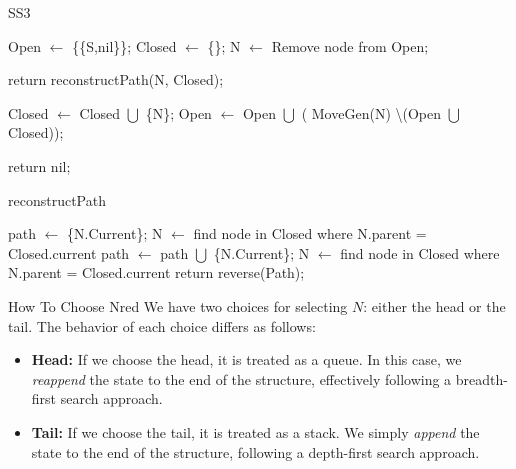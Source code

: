 \begin{algorithm}[ht]
\caption{SS3}
\begin{algorithmic}
\State Open \(\gets\) \{\{S,nil\}\};
\State Closed \(\gets\) \{\};
\vspace{0.1cm}
\State N \(\gets\) Remove node from Open;

\vspace{0.07cm}
\State return reconstructPath(N, Closed);
\Else

\State Closed \(\gets\) Closed \(\bigcup\) \{N\};
\State Open \(\gets\) Open \(\bigcup\) ( MoveGen(N) \textbackslash\hspace{0.1cm}(Open \(\bigcup\) Closed));
\EndIf

\vspace{0.07cm}
\EndWhile

\vspace{0.1cm}
\State return nil;
\end{algorithmic}
\end{algorithm}

\newpage
\null
\begin{algorithm}[ht]
\caption{reconstructPath}
\begin{algorithmic}
\State path \(\gets\) \{N.Current\};
\State N \(\gets\) find node in Closed where N.parent = Closed.current 
\vspace{0.1cm}
\State path \(\gets\) path \(\bigcup\) \{N.Current\};
\State N \(\gets\) find node in Closed where N.parent = Closed.current 
\EndWhile
\vspace{0.1cm}
\State return reverse(Path);
\EndFunction
\end{algorithmic}
\end{algorithm}

\vspace{0.35cm}

\begin{prettyBox}{How To Choose N}{red}
We have two choices for selecting \( N \): either the head or the tail. The behavior of each choice differs as follows:
\begin{itemize}
    \item \textbf{Head:} If we choose the head, it is treated as a queue. In this case, we \textit{reappend} the state to the end of the structure, effectively following a breadth-first search approach.
    \item \textbf{Tail:} If we choose the tail, it is treated as a stack. We simply \textit{append} the state to the end of the structure, following a depth-first search approach.
\end{itemize}
\end{prettyBox}

